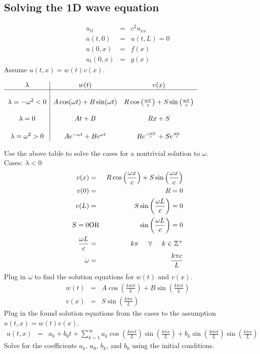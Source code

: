 \documentclass{article}
\def\Z{\mathbb{Z}}
\newcommand{\bea}{\begin{eqnarray*}}
\newcommand{\eea}{\end{eqnarray*}}
\begin{document}
\subsection{Solving the 1D wave equation}
\bea
u_{tt} &=& c^2u_{xx}\\
u(t,0) &=& u(t,L) = 0\\
u(0,x) &=& f(x)\\
u_t(0,x) &=& g(x)
\eea
Assume $u(t,x) = w(t)v(x)$.
\begin{center}
$\begin{array}{c|c c} 
\lambda & w(t) & v(x)\\   
\hline\\
\lambda = -\omega^2<0 & A\cos(\omega t)+B\sin(\omega t) & R\cos\left(\frac{\omega x}{c}\right)+S\sin\left(\frac{\omega x}{c}\right)\\\\
\lambda = 0 & At+B & Rx+S\\\\
\lambda = \omega^2>0 & Ae^{-\omega t}+Be^{\omega t} & Re^{\frac{-\omega x}{c}}+Se^{\frac{\omega x}{c}}\\
\end{array}$
\end{center}
Use the above table to solve the cases for a nontrivial solution to $\omega$.\\
Cases: $\lambda<0$
\bea
v(x) &=& R\cos\left(\frac{\omega x}{c}\right)+S\sin\left(\frac{\omega x}{c}\right)\\
v(0) &=& R = 0\\
v(L) &=& S\sin\left(\frac{\omega L}{c}\right) = 0\\
S = 0 &\mbox{OR}& \sin\left(\frac{\omega L}{c}\right) = 0\\
\frac{\omega L}{c} &=& k\pi \hspace{5mm} \forall \hspace{5mm} k \in \Z^+\\
\omega &=& \frac{k\pi c}{L}
\eea
Plug in $\omega$ to find the solution equations for $w(t)$ and $v(x)$.
\bea
w(t) &=& A\cos\left(\frac{k\pi ct}{L}\right)+B\sin\left(\frac{k\pi ct}{L}\right)\\
v(x) &=& S\sin\left(\frac{k\pi x}{L}\right)
\eea
Plug in the found solution equations from the cases to the assumption $u(t,x) = w(t)v(x)$.
\bea
u(t,x) &=& a_0+b_0t+\sum_{k=1}^{\infty}{a_k\cos\left(\frac{k\pi ct}{L}\right)\sin\left(\frac{k\pi x}{L}\right)+b_k\sin\left(\frac{k\pi ct}{L}\right)\sin\left(\frac{k\pi x}{L}\right)}
\eea
Solve for the coefficients $a_k$, $a_0$, $b_k$, and $b_0$ using the initial conditions.
\end{document}
